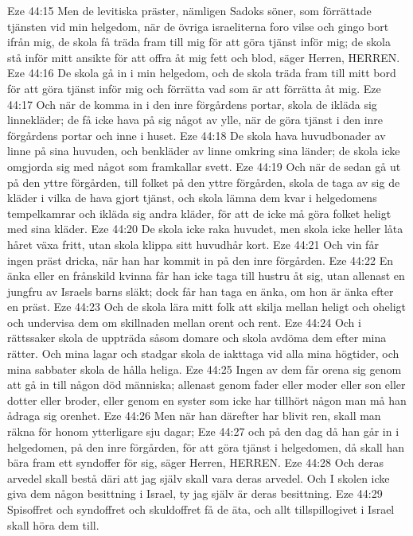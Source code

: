 Eze 44:15  Men de levitiska präster, nämligen Sadoks söner, som förrättade tjänsten vid min helgedom, när de övriga israeliterna foro vilse och gingo bort ifrån mig, de skola få träda fram till mig för att göra tjänst inför mig; de skola stå inför mitt ansikte för att offra åt mig fett och blod, säger Herren, HERREN.
Eze 44:16  De skola gå in i min helgedom, och de skola träda fram till mitt bord för att göra tjänst inför mig och förrätta vad som är att förrätta åt mig.
Eze 44:17  Och när de komma in i den inre förgårdens portar, skola de ikläda sig linnekläder; de få icke hava på sig något av ylle, när de göra tjänst i den inre förgårdens portar och inne i huset.
Eze 44:18  De skola hava huvudbonader av linne på sina huvuden, och benkläder av linne omkring sina länder; de skola icke omgjorda sig med något som framkallar svett.
Eze 44:19  Och när de sedan gå ut på den yttre förgården, till folket på den yttre förgården, skola de taga av sig de kläder i vilka de hava gjort tjänst, och skola lämna dem kvar i helgedomens tempelkamrar och ikläda sig andra kläder, för att de icke må göra folket heligt med sina kläder.
Eze 44:20  De skola icke raka huvudet, men skola icke heller låta håret växa fritt, utan skola klippa sitt huvudhår kort.
Eze 44:21  Och vin får ingen präst dricka, när han har kommit in på den inre förgården.
Eze 44:22  En änka eller en frånskild kvinna får han icke taga till hustru åt sig, utan allenast en jungfru av Israels barns släkt; dock får han taga en änka, om hon är änka efter en präst.
Eze 44:23  Och de skola lära mitt folk att skilja mellan heligt och oheligt och undervisa dem om skillnaden mellan orent och rent.
Eze 44:24  Och i rättssaker skola de uppträda såsom domare och skola avdöma dem efter mina rätter. Och mina lagar och stadgar skola de iakttaga vid alla mina högtider, och mina sabbater skola de hålla heliga.
Eze 44:25  Ingen av dem får orena sig genom att gå in till någon död människa; allenast genom fader eller moder eller son eller dotter eller broder, eller genom en syster som icke har tillhört någon man må han ådraga sig orenhet.
Eze 44:26  Men när han därefter har blivit ren, skall man räkna för honom ytterligare sju dagar;
Eze 44:27  och på den dag då han går in i helgedomen, på den inre förgården, för att göra tjänst i helgedomen, då skall han bära fram ett syndoffer för sig, säger Herren, HERREN.
Eze 44:28  Och deras arvedel skall bestå däri att jag själv skall vara deras arvedel. Och I skolen icke giva dem någon besittning i Israel, ty jag själv är deras besittning.
Eze 44:29  Spisoffret och syndoffret och skuldoffret få de äta, och allt tillspillogivet i Israel skall höra dem till.
